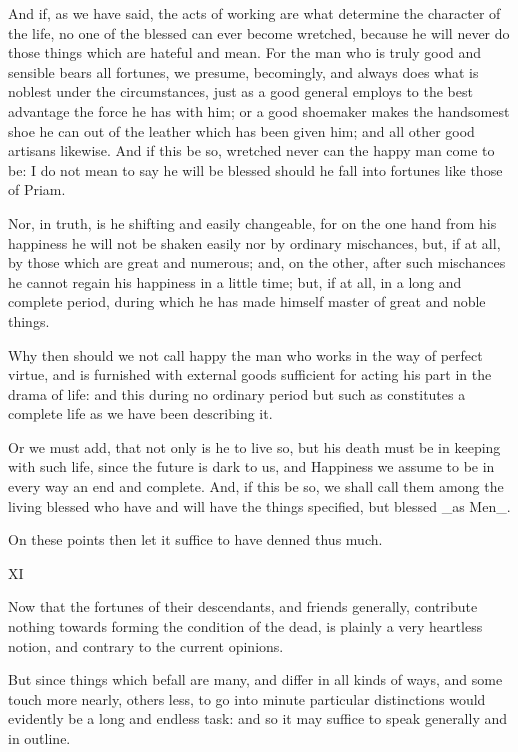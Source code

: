 And if, as we have said, the acts of working are what determine the
character of the life, no one of the blessed can ever become wretched,
because he will never do those things which are hateful and mean. For
the man who is truly good and sensible bears all fortunes, we presume,
becomingly, and always does what is noblest under the circumstances,
just as a good general employs to the best advantage the force he has
with him; or a good shoemaker makes the handsomest shoe he can out
of the leather which has been given him; and all other good artisans
likewise. And if this be so, wretched never can the happy man come to
be: I do not mean to say he will be blessed should he fall into fortunes
like those of Priam.

Nor, in truth, is he shifting and easily changeable, for on the one
hand from his happiness he will not be shaken easily nor by ordinary
mischances, but, if at all, by those which are great and numerous; and,
on the other, after such mischances he cannot regain his happiness in a
little time; but, if at all, in a long and complete period, during which
he has made himself master of great and noble things.

Why then should we not call happy the man who works in the way of
perfect virtue, and is furnished with external goods sufficient for
acting his part in the drama of life: and this during no ordinary period
but such as constitutes a complete life as we have been describing it.

Or we must add, that not only is he to live so, but his death must be in
keeping with such life, since the future is dark to us, and Happiness we
assume to be in every way an end and complete. And, if this be so, we
shall call them among the living blessed who have and will have the
things specified, but blessed _as Men_.

On these points then let it suffice to have denned thus much.


XI

Now that the fortunes of their descendants, and friends generally,
contribute nothing towards forming the condition of the dead, is plainly
a very heartless notion, and contrary to the current opinions.

But since things which befall are many, and differ in all kinds of ways,
and some touch more nearly, others less, to go into minute particular
distinctions would evidently be a long and endless task: and so it may
suffice to speak generally and in outline.

